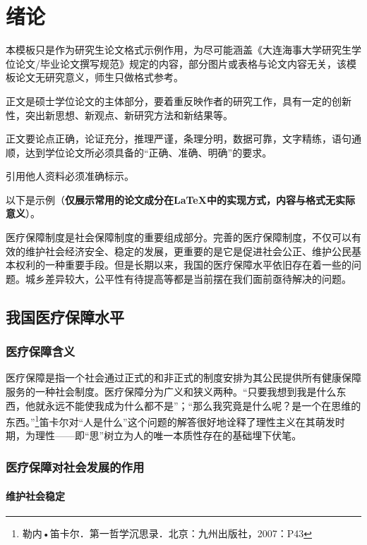 
\section{绪论}

本模板只是作为研究生论文格式示例作用，为尽可能涵盖《大连海事大学研究生学位论文/毕业论文撰写规范》规定的内容，部分图片或表格与论文内容无关，该模板论文无研究意义，师生只做格式参考。

正文是硕士学位论文的主体部分，要着重反映作者的研究工作，具有一定的创新性，突出新思想、新观点、新研究方法和新结果等。

正文要论点正确，论证充分，推理严谨，条理分明，数据可靠，文字精练，语句通顺，达到学位论文所必须具备的“正确、准确、明确”的要求。

引用他人资料必须准确标示。

以下是示例（{\bf 仅展示常用的论文成分在LaTeX中的实现方式，内容与格式无实际意义}）。

医疗保障制度是社会保障制度的重要组成部分。完善的医疗保障制度，不仅可以有效的维护社会经济安全、稳定的发展，更重要的是它是促进社会公正、维护公民基本权利的一种重要手段。但是长期以来，我国的医疗保障水平依旧存在着一些的问题。城乡差异较大，公平性有待提高等都是当前摆在我们面前亟待解决的问题。

\subsection{我国医疗保障水平}

\subsubsection{医疗保障含义}

医疗保障是指一个社会通过正式的和非正式的制度安排为其公民提供所有健康保障服务的一种社会制度。医疗保障分为广义和狭义两种。“只要我想到我是什么东西，他就永远不能使我成为什么都不是”；“那么我究竟是什么呢？是一个在思维的东西。”\footnote{勒内•笛卡尔．第一哲学沉思录．北京：九州出版社，2007：P43}笛卡尔对“人是什么”这个问题的解答很好地诠释了理性主义在其萌发时期，为理性——即“思”树立为人的唯一本质性存在的基础埋下伏笔。

\subsubsection{医疗保障对社会发展的作用}

\paragraph{维护社会稳定}


